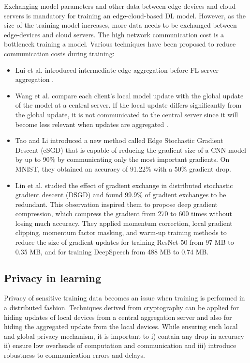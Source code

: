 \documentclass[letterpaper, 10 pt, conference]{ieeeconf}
\begin{document}
Exchanging model parameters and other data between edge-devices and cloud servers is mandatory for training an edge-cloud-based DL model. However, as the size of the training model increases, more data needs to be exchanged between edge-devices and cloud servers. The high network communication cost is a bottleneck training a model. Various techniques have been proposed to reduce communication costs during training:
\begin{itemize}
	\item Lui et al. introduced intermediate edge aggregation before FL server aggregation \cite{Liu_Zhang_Song_Letaief_2019}.
	\item Wang et al. compare each client's local model update with the global update of the model at a central server. If the local update differs significantly from the global update, it is not communicated to the central server since it will become less relevant when updates are aggregated \cite{WANG_WANG_LI_2019}.
	\item Tao and Li introduced a new method called Edge Stochastic Gradient Descent (eSGD)\cite{Tao_Li_2018} that is capable of reducing the gradient size of a CNN model by up to 90\% by communicating only the most important gradients. On MNIST, they obtained an accuracy of 91.22\% with a 50\% gradient drop.
	\item Lin et al. studied the effect of gradient exchange in distributed stochastic gradient descent (DSGD) and found 99.9\% of gradient exchanges to be redundant\cite{Lin_Han_Mao_Wang_Dally_2020}. This observation inspired them to propose deep gradient compression, which compress the gradient from 270 to 600 times without losing much accuracy. They applied momentum correction, local gradient clipping, momentum factor masking, and warm-up training methods to reduce the size of gradient updates for training ResNet-50 from 97 MB to 0.35 MB, and for training DeepSpeech\cite{Hannun_Case_Casper_Catanzaro_Diamos_Elsen_Prenger_Satheesh_Sengupta_Coates_et} from 488 MB to 0.74 MB.
\end{itemize}
\subsection{Privacy in learning}
Privacy of sensitive training data becomes an issue when training is performed in a distributed fashion. Techniques derived from cryptography can be applied for hiding updates of local devices from a central aggregation server\cite{Bonawitz_Ivanov_Kreuter_Marcedone_McMahan_Patel_Ramage_Segal_Seth_2017} and also for hiding the aggregated update from the local devices\cite{Geyer_Klein_Nabi_2018}. While ensuring such local and global privacy mechanism, it is important to i) contain any drop in accuracy ii) ensure low overheads of computation and communication and iii) introduce robustness to communication errors and delays.
\end{document}
